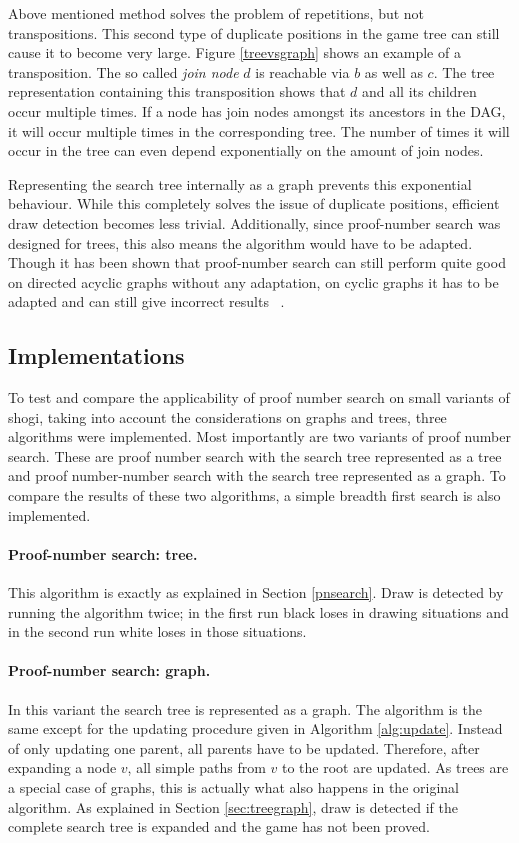 \documentclass[a4paper, 11pt]{article}
\begin{document}
Above mentioned method solves the problem of repetitions, but not transpositions. This second type of duplicate positions in the game tree
can still cause it to become very large. Figure \ref{treevsgraph} shows an example of a transposition. The so called \emph{join node} $d$ is
reachable via $b$ as well as $c$. The tree representation containing this transposition shows that $d$ and all its children occur multiple times.
If a node has join nodes amongst its ancestors in the DAG, it will
occur multiple times in the corresponding tree. The number of times it will occur in the tree can even depend exponentially on the amount of join
nodes.

Representing the search tree internally as a graph prevents this exponential behaviour. While this completely solves the issue of duplicate
positions, efficient draw detection becomes less trivial. Additionally, since proof-number search was designed for trees, this also means
the algorithm would have to be adapted.
Though it has been shown that proof-number search can still perform quite good on directed acyclic graphs without any adaptation,
on cyclic graphs it has to be adapted and can still give incorrect results ~\cite{Schijf93}.\\

\subsection{Implementations}
To test and compare the applicability of proof number search on small variants of shogi, taking into account the considerations on graphs and trees,
three algorithms were implemented. Most importantly are two variants of proof number search. These are proof number search with the search tree
represented as a tree and proof number-number search with the search tree represented as a graph.
To compare the results of these two algorithms, a simple breadth first search is also implemented.

\paragraph{Proof-number search: tree.} This algorithm is exactly as explained in Section \ref{pnsearch}. Draw is detected by running
the algorithm twice; in the first run black loses in drawing situations and in the second run white loses in those situations.

\paragraph{Proof-number search: graph.} In this variant the search tree is represented as a graph. The algorithm is the same except for the updating
procedure given in Algorithm \ref{alg:update}. Instead of only updating one parent, all parents have to be updated. Therefore, after expanding a
node $v$, all simple paths from $v$ to the root are updated. As trees are a special case of graphs, this is actually what also happens in the original
algorithm. As explained in Section \ref{sec:treegraph}, draw is detected if the complete search tree is expanded and the game has not been proved.
\end{document}
